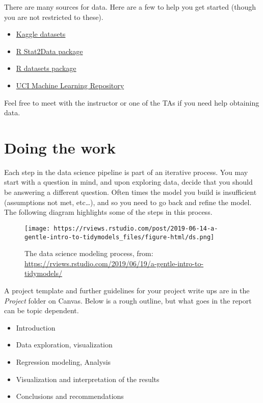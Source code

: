\documentclass[
]{article}
\providecommand{\tightlist}{%
  \setlength{\itemsep}{0pt}\setlength{\parskip}{0pt}}
\begin{document}
There are many sources for data. Here are a few to help you get started
(though you are not restricted to these).

\begin{itemize}
\tightlist
\item
  \href{https://www.kaggle.com/datasets}{Kaggle datasets}
\item
  \href{https://cran.r-project.org/web/packages/Stat2Data/Stat2Data.pdf}{R
  Stat2Data package}
\item
  \href{https://stat.ethz.ch/R-manual/R-devel/library/datasets/html/00Index.html}{R
  datasets package}
\item
  \href{https://archive.ics.uci.edu/datasets}{UCI Machine Learning
  Repository}
\end{itemize}

Feel free to meet with the instructor or one of the TAs if you need help
obtaining data.

\hypertarget{doing-the-work}{%
\section{Doing the work}\label{doing-the-work}}

Each step in the data science pipeline is part of an iterative process.
You may start with a question in mind, and upon exploring data, decide
that you should be answering a different question. Often times the model
you build is insufficient (assumptions not met, etc\ldots), and so you
need to go back and refine the model. The following diagram highlights
some of the steps in this process.

\begin{figure}
\centering
\texttt{[image: https://rviews.rstudio.com/post/2019-06-14-a-gentle-intro-to-tidymodels\_files/figure-html/ds.png]}
\caption{The data science modeling process, from:
\url{https://rviews.rstudio.com/2019/06/19/a-gentle-intro-to-tidymodels/}}
\end{figure}

A project template and further guidelines for your project write ups are
in the \emph{Project} folder on Canvas. Below is a rough outline, but
what goes in the report can be topic dependent.

\begin{itemize}
\tightlist
\item
  Introduction
\item
  Data exploration, visualization
\item
  Regression modeling, Analysis
\item
  Visualization and interpretation of the results
\item
  Conclusions and recommendations
\end{itemize}
\end{document}
